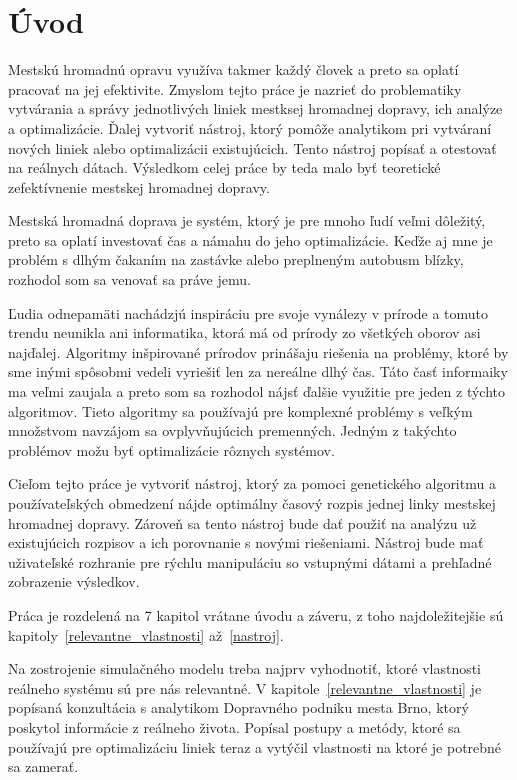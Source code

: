 \chapter{Úvod}\label{uvod}

Mestskú hromadnú opravu využíva takmer každý človek a preto sa oplatí pracovať na jej efektivite.
Zmyslom tejto práce je nazrieť do problematiky vytvárania a správy jednotlivých liniek mestksej hromadnej dopravy, ich analýze a optimalizácie.
Ďalej vytvoriť nástroj, ktorý pomôže analytikom pri vytváraní nových liniek alebo optimalizácii existujúcich.
Tento nástroj popísať a otestovať na reálnych dátach.
Výsledkom celej práce by teda malo byť teoretické zefektívnenie mestskej hromadnej dopravy.

Mestská hromadná doprava je systém, ktorý je pre mnoho ľudí veľmi dôležitý, preto sa oplatí investovať čas a námahu do jeho optimalizácie.
Keďže aj mne je problém s dlhým čakaním na zastávke alebo preplneným autobusm blízky, rozhodol som sa venovať sa práve jemu.

Ľudia odnepamäti nachádzjú inspiráciu pre svoje vynálezy v prírode a tomuto trendu neunikla ani informatika, ktorá má od prírody zo všetkých oborov asi najďalej.
Algoritmy inšpirované prírodov prinášaju riešenia na problémy, ktoré by sme inými spôsobmi vedeli vyriešiť len za nereálne dlhý čas.
Táto časť informaiky ma veľmi zaujala a preto som sa rozhodol nájsť ďalšie využitie pre jeden z týchto algoritmov.
Tieto algoritmy sa používajú pre komplexné problémy s veľkým množstvom navzájom sa ovplyvňujúcich premenných.
Jedným z takýchto problémov možu byť optimalizácie rôznych systémov.

Cieľom tejto práce je vytvoriť nástroj, ktorý za pomoci genetického algoritmu a používateľských obmedzení nájde optimálny časový rozpis jednej linky mestskej hromadnej dopravy.
Zároveň sa tento nástroj bude dať použiť na analýzu už existujúcich rozpisov a ich porovnanie s novými riešeniami.
Nástroj bude mať uživateľské rozhranie pre rýchlu manipuláciu so vstupnými dátami a prehľadné zobrazenie výsledkov.

Práca je rozdelená na 7 kapitol vrátane úvodu a záveru, z toho najdoležitejšie sú kapitoly~\ref{relevantne_vlastnosti} až~\ref{nastroj}.

Na zostrojenie simulačného modelu treba najprv vyhodnotiť, ktoré vlastnosti reálneho systému sú pre nás relevantné.
V kapitole~\ref{relevantne_vlastnosti} je popísaná konzultácia s analytikom Dopravného podniku mesta Brno, ktorý poskytol informácie z reálneho života.
Popísal postupy a metódy, ktoré sa používajú pre optimalizáciu liniek teraz a vytýčil vlastnosti na ktoré je potrebné sa zamerať. 

